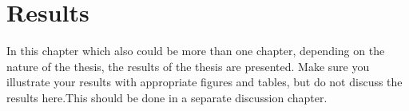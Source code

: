 
\chapter{Results}
  \label{results}

In this chapter which also could be more than one chapter, depending on the nature of the thesis, the results of the thesis are presented.
Make sure you illustrate your results with appropriate figures and tables, but do not discuss the results here.This should be done in a separate discussion chapter.

\clearpage

